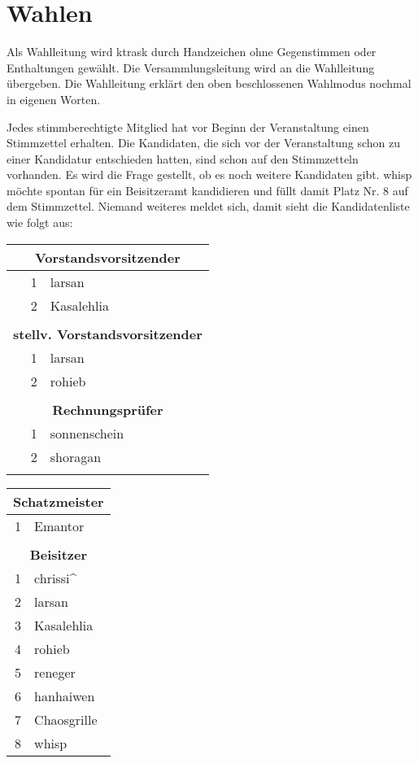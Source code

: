 \documentclass{s0minutes}
\begin{document}
\section{Wahlen}

Als Wahlleitung wird ktrask durch Handzeichen ohne Gegenstimmen oder
Enthaltungen gewählt. Die Versammlungsleitung wird an die Wahlleitung übergeben.
Die Wahlleitung erklärt den oben beschlossenen Wahlmodus nochmal in eigenen
Worten.

Jedes stimmberechtigte Mitglied hat vor Beginn der Veranstaltung einen
Stimmzettel erhalten. Die Kandidaten, die sich vor der Veranstaltung schon zu
einer Kandidatur entschieden hatten, sind schon auf den Stimmzetteln vorhanden.
Es wird die Frage gestellt, ob es noch weitere Kandidaten gibt. whisp möchte
spontan für ein Beisitzeramt kandidieren und füllt damit Platz Nr. 8 auf dem
Stimmzettel. Niemand weiteres meldet sich, damit sieht die Kandidatenliste wie
folgt aus:

\begin{center}
\begin{multicols}{2}
\begin{tabular}{rl}
  \multicolumn{2}{c}{\bfseries Vorstandsvorsitzender} \\
  \midrule
  1 & larsan \\
  2 & Kasalehlia \\
  \\
  \multicolumn{2}{c}{\bfseries stellv. Vorstandsvorsitzender} \\
  \midrule
  1 & larsan \\
  2 & rohieb \\
  \\
  \multicolumn{2}{c}{\bfseries Rechnungsprüfer} \\
  \midrule
  1 & sonnenschein \\
  2 & shoragan \\
  \\
\end{tabular}
\begin{tabular}{rl}
  \multicolumn{2}{c}{\bfseries Schatzmeister} \\
  \midrule
  1 & Emantor \\
  \\
  \multicolumn{2}{c}{\bfseries Beisitzer} \\
  \midrule
  1 & chrissi\^{} \\
  2 & larsan \\
  3 & Kasalehlia \\
  4 & rohieb \\
  5 & reneger \\
  6 & hanhaiwen \\
  7 & Chaosgrille \\
  8 & whisp \\
\end{tabular}
\end{multicols}
\end{center}
\end{document}
